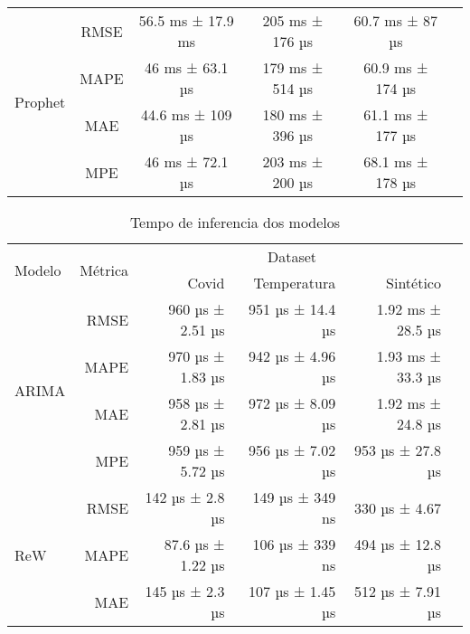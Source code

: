 \begin{table}[!htp]
\begin{tabular}{cccccc}
        \multirow{4}{*}{Prophet} & RMSE                     & 56.5 ms ± 17.9 ms           & 205 ms ± 176 µs  & 60.7 ms ± 87 µs  \\
                                 & MAPE                     & 46 ms ± 63.1 µs             & 179 ms ± 514 µs  & 60.9 ms ± 174 µs \\
                                 & MAE                      & 44.6 ms ± 109 µs            & 180 ms ± 396 µs  & 61.1 ms ± 177 µs \\
                                 & MPE                      & 46 ms ± 72.1 µs             & 203 ms ± 200 µs  & 68.1 ms ± 178 µs \\
        \bottomrule
    \end{tabular}
\end{table}

\begin{table}[!htp]\centering
    \caption{Tempo de inferencia dos modelos}
    \begin{tabular}{lrrrrr}\toprule
        \multirow{2}{*}{Modelo}  & \multirow{2}{*}{Métrica} & \multicolumn{3}{c}{Dataset}                                        \\\cmidrule{3-5}
                                 &                          & Covid                       & Temperatura      & Sintético         \\ \midrule
        \multirow{4}{*}{ARIMA}   & RMSE                     & 960 µs ± 2.51 µs            & 951 µs ± 14.4 µs & 1.92 ms ± 28.5 µs \\
                                 & MAPE                     & 970 µs ± 1.83 µs            & 942 µs ± 4.96 µs & 1.93 ms ± 33.3 µs \\
                                 & MAE                      & 958 µs ± 2.81 µs            & 972 µs ± 8.09 µs & 1.92 ms ± 24.8 µs \\
                                 & MPE                      & 959 µs ± 5.72 µs            & 956 µs ± 7.02 µs & 953 µs ± 27.8 µs  \\ \midrule
        \multirow{4}{*}{ReW}     & RMSE                     & 142 µs ± 2.8 µs             & 149 µs ± 349 ns  & 330 µs ± 4.67     \\
                                 & MAPE                     & 87.6 µs ± 1.22 µs           & 106 µs ± 339 ns  & 494 µs ± 12.8 µs  \\
                                 & MAE                      & 145 µs ± 2.3 µs             & 107 µs ± 1.45 µs & 512 µs ± 7.91 µs  \\

\end{tabular}
\end{table}

